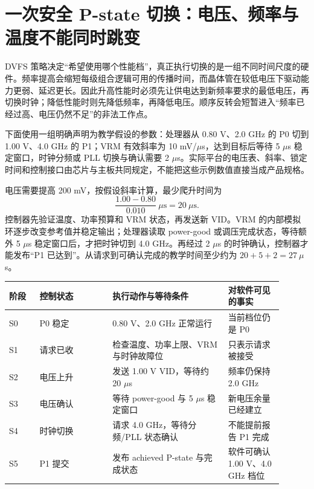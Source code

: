 \section{一次安全 P-state 切换：电压、频率与温度不能同时跳变}

DVFS 策略决定“希望使用哪个性能档”，真正执行切换的是一组不同时间尺度的硬件。频率提高会缩短每级组合逻辑可用的传播时间，而晶体管在较低电压下驱动能力更弱、延迟更长。因此升高性能时必须先让供电达到新频率要求的最低电压，再切换时钟；降低性能时则先降低频率，再降低电压。顺序反转会短暂进入“频率已经过高、电压仍然不足”的非法工作点。

下面使用一组明确声明为教学假设的参数：处理器从 0.80 V、2.0 GHz 的 P0 切到 1.00 V、4.0 GHz 的 P1；VRM 有效斜率为 10 mV/$\mu$s，达到目标后等待 5 $\mu$s 稳定窗口，时钟分频或 PLL 切换与确认需要 2 $\mu$s。实际平台的电压表、斜率、锁定时间和控制接口由芯片与主板共同规定，不能把这些示例数值直接当成产品规格。


电压需要提高 200 mV，按假设斜率计算，最少爬升时间为
\[
  \frac{1.00-0.80}{0.010}\ \mu\mathrm{s}=20\ \mu\mathrm{s}.
\]
控制器先验证温度、功率预算和 VRM 状态，再发送新 VID。VRM 的内部模拟环逐步改变参考值并稳定输出；处理器读取 power-good 或调压完成状态，等待额外 5 $\mu$s 稳定窗口后，才把时钟切到 4.0 GHz。再经过 2 $\mu$s 的时钟确认，控制器才能发布“P1 已达到”。从请求到可确认完成的教学时间至少约为 $20+5+2=27\ \mu$s。

\begin{longtable}{L{0.10\linewidth}L{0.24\linewidth}L{0.38\linewidth}L{0.18\linewidth}}
\toprule
阶段 & 控制状态 & 执行动作与等待条件 & 对软件可见的事实 \\
\midrule
S0 & P0 稳定 & 0.80 V、2.0 GHz 正常运行 & 当前档位仍是 P0 \\
S1 & 请求已收 & 检查温度、功率上限、VRM 与时钟故障位 & 只表示请求被接受 \\
S2 & 电压上升 & 发送 1.00 V VID，等待约 20 $\mu$s & 频率仍保持 2.0 GHz \\
S3 & 电压确认 & 等待 power-good 与 5 $\mu$s 稳定窗口 & 新电压余量已经建立 \\
S4 & 时钟切换 & 请求 4.0 GHz，等待分频/PLL 状态确认 & 不能提前报告 P1 完成 \\
S5 & P1 提交 & 发布 achieved P-state 与完成状态 & 软件可确认 1.00 V、4.0 GHz 档位 \\
\bottomrule
\end{longtable}

